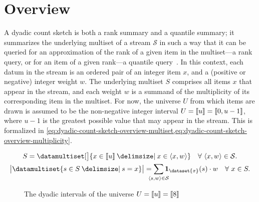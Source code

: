 \section{Overview}
\label{sec:dyadic-count-sketch-overview}

A dyadic count sketch is both a rank summary and a quantile summary; it summarizes the underlying multiset of a stream \( \mathcal{S} \) in such a way that it can be queried for an approximation of the rank of a given item in the multiset---a rank query, or for an item of a given rank---a quantile query~\citep{wang13}.
In this context, each datum in the stream is an ordered pair of an integer item \( x \), and a (positive or negative) integer weight \( w \).
The underlying multiset \( S \) comprises all items \( x \) that appear in the stream, and each weight \( w \) is a summand of the multiplicity of its corresponding item in the multiset.
For now, the universe \( U \) from which items are drawn is assumed to be the non-negative integer interval \( U = \llbracket u\rrbracket = \llbracket0, u - 1\rrbracket \), where \( u - 1 \) is the greatest possible value that may appear in the stream.
This is formalized in \cref{eq:dyadic-count-sketch-overview-multiset,eq:dyadic-count-sketch-overview-multiplicity}.

\begin{gather}
  \label{eq:dyadic-count-sketch-overview-multiset}
  S = \datamultiset[\big]{x \in \dataintegerinterval{u} \suchthat x \in \datasequence{x, w}} \quad \forall\ \datasequence{x, w} \in \mathcal{S}. \\
  \label{eq:dyadic-count-sketch-overview-multiplicity}
  \cardinality[\big]{\datamultiset{s \in S \suchthat s = x}} = \smashoperator{\sum_{\datasequence{s, w} \in \mathcal{S}}} \indicator_{\dataset{x}} (s) \cdot w \quad \forall\ x \in S.
\end{gather}

\begin{figure}
  \centering
  \caption{The dyadic intervals of the universe \( U = \llbracket u\rrbracket = \llbracket8\rrbracket \)}
  \label{fig:dyadic-count-sketch-overview-binary-tree}
\end{figure}

